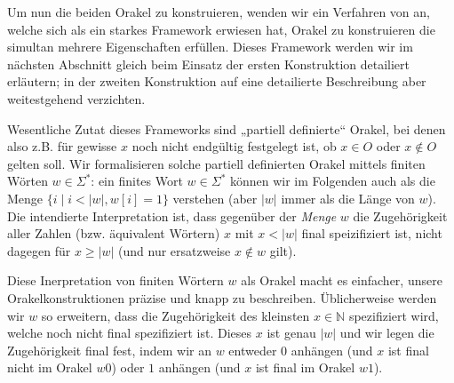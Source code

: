 Um nun die beiden Orakel zu konstruieren, wenden wir ein Verfahren von \textcite{dose_np-completeness_2019} an, welche sich als ein starkes Framework erwiesen hat, Orakel zu konstruieren die simultan mehrere Eigenschaften erfüllen.
Dieses Framework werden wir im nächsten Abschnitt gleich beim Einsatz der ersten Konstruktion detailiert erläutern; in der zweiten Konstruktion auf eine detailierte Beschreibung aber weitestgehend verzichten.

Wesentliche Zutat dieses Frameworks sind „partiell definierte“ Orakel, bei denen also z.B. für gewisse $x$ noch nicht endgültig festgelegt ist, ob $x\in O$ oder $x\not\in O$ gelten soll.
Wir formalisieren solche partiell definierten Orakel mittels finiten Wörten $w\in\Sigma^*$:
ein finites Wort $w\in\Sigma^*$ können wir im Folgenden auch als die Menge $\{ i \mid i<|w|, w[i] = 1 \}$ verstehen (aber $|w|$ immer als die Länge von $w$).
Die intendierte Interpretation ist, dass gegenüber der \emph{Menge} $w$ die Zugehörigkeit aller Zahlen (bzw. äquivalent Wörtern) $x$ mit $x<|w|$ final speizifiziert ist, nicht dagegen für $x\geq|w|$ (und nur ersatzweise $x\not\in w$ gilt).

Diese Inerpretation von finiten Wörtern $w$ als Orakel macht es einfacher, unsere Orakelkonstruktionen präzise und knapp zu beschreiben. Üblicherweise werden wir $w$ so erweitern, dass die Zugehörigkeit des kleinsten $x\in\mathbb N$ spezifiziert wird, welche noch nicht final spezifiziert ist. Dieses $x$ ist genau $|w|$ und wir legen die Zugehörigkeit final fest, indem wir an $w$ entweder $0$ anhängen (und $x$ ist final nicht im Orakel $w0$) oder $1$ anhängen (und $x$ ist final im Orakel $w1$).


